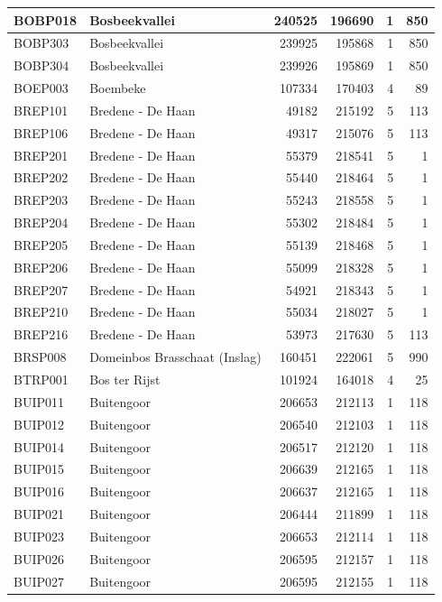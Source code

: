 \documentclass[11pt,]{book}
\begin{document}
\begin{table}
\begin{tabular}[t]{l|l|r|r|r|r}
\hline
BOBP018 & Bosbeekvallei & 240525 & 196690 & 1 & 850\\
\hline
BOBP303 & Bosbeekvallei & 239925 & 195868 & 1 & 850\\
\hline
BOBP304 & Bosbeekvallei & 239926 & 195869 & 1 & 850\\
\hline
BOEP003 & Boembeke & 107334 & 170403 & 4 & 89\\
\hline
BREP101 & Bredene - De Haan & 49182 & 215192 & 5 & 113\\
\hline
BREP106 & Bredene - De Haan & 49317 & 215076 & 5 & 113\\
\hline
BREP201 & Bredene - De Haan & 55379 & 218541 & 5 & 1\\
\hline
BREP202 & Bredene - De Haan & 55440 & 218464 & 5 & 1\\
\hline
BREP203 & Bredene - De Haan & 55243 & 218558 & 5 & 1\\
\hline
BREP204 & Bredene - De Haan & 55302 & 218484 & 5 & 1\\
\hline
BREP205 & Bredene - De Haan & 55139 & 218468 & 5 & 1\\
\hline
BREP206 & Bredene - De Haan & 55099 & 218328 & 5 & 1\\
\hline
BREP207 & Bredene - De Haan & 54921 & 218343 & 5 & 1\\
\hline
BREP210 & Bredene - De Haan & 55034 & 218027 & 5 & 1\\
\hline
BREP216 & Bredene - De Haan & 53973 & 217630 & 5 & 113\\
\hline
BRSP008 & Domeinbos Brasschaat (Inslag) & 160451 & 222061 & 5 & 990\\
\hline
BTRP001 & Bos ter Rijst & 101924 & 164018 & 4 & 25\\
\hline
BUIP011 & Buitengoor & 206653 & 212113 & 1 & 118\\
\hline
BUIP012 & Buitengoor & 206540 & 212103 & 1 & 118\\
\hline
BUIP014 & Buitengoor & 206517 & 212120 & 1 & 118\\
\hline
BUIP015 & Buitengoor & 206639 & 212165 & 1 & 118\\
\hline
BUIP016 & Buitengoor & 206637 & 212165 & 1 & 118\\
\hline
BUIP021 & Buitengoor & 206444 & 211899 & 1 & 118\\
\hline
BUIP023 & Buitengoor & 206653 & 212114 & 1 & 118\\
\hline
BUIP026 & Buitengoor & 206595 & 212157 & 1 & 118\\
\hline
BUIP027 & Buitengoor & 206595 & 212155 & 1 & 118\\

\end{tabular}
\end{table}
\end{document}
